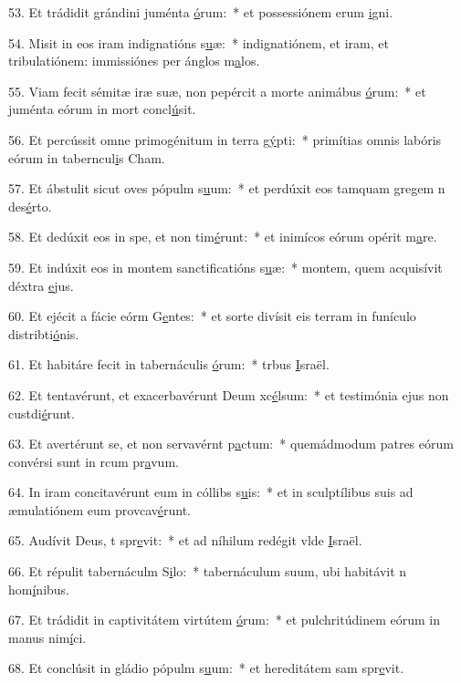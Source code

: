 53. Et trádidit grándini juménta \uline{ó}rum:~* et possessiónem erum \uline{i}gni.\par 
54. Misit in eos iram indignatións s\uline{u}æ:~* indignatiónem, et iram, et tribulatiónem: immissiónes per ánglos m\uline{a}los.\par 
55. Viam fecit sémitæ iræ suæ, non pepércit a morte animábus \uline{ó}rum:~* et juménta eórum in mort concl\uline{ú}sit.\par 
56. Et percússit omne primogénitum in terra g\uline{ý}pti:~* primítias omnis labóris eórum in taberncul\uline{i}s Cham.\par 
57. Et ábstulit sicut oves pópulm s\uline{u}um:~* et perdúxit eos tamquam gregem n des\uline{é}rto.\par 
58. Et dedúxit eos in spe, et non tim\uline{é}runt:~* et inimícos eórum opérit m\uline{a}re.\par 
59. Et indúxit eos in montem sanctificatións s\uline{u}æ:~* montem, quem acquisívit déxtra \uline{e}jus.\par 
60. Et ejécit a fácie eórm G\uline{e}ntes:~* et sorte divísit eis terram in funículo distribti\uline{ó}nis.\par 
61. Et habitáre fecit in tabernáculis \uline{ó}rum:~* trbus \uline{I}sraël.\par 
62. Et tentavérunt, et exacerbavérunt Deum xc\uline{é}lsum:~* et testimónia ejus non custdi\uline{é}runt.\par 
63. Et avertérunt se, et non servavérnt p\uline{a}ctum:~* quemádmodum patres eórum convérsi sunt in rcum pr\uline{a}vum.\par 
64. In iram concitavérunt eum in cóllibs s\uline{u}is:~* et in sculptílibus suis ad æmulatiónem eum provcav\uline{é}runt.\par 
65. Audívit Deus, t spr\uline{e}vit:~* et ad níhilum redégit vlde \uline{I}sraël.\par 
66. Et répulit tabernáculm S\uline{i}lo:~* tabernáculum suum, ubi habitávit n hom\uline{í}nibus.\par 
67. Et trádidit in captivitátem virtútem \uline{ó}rum:~* et pulchritúdinem eórum in manus nim\uline{í}ci.\par 
68. Et conclúsit in gládio pópulm s\uline{u}um:~* et hereditátem sam spr\uline{e}vit.\par 
